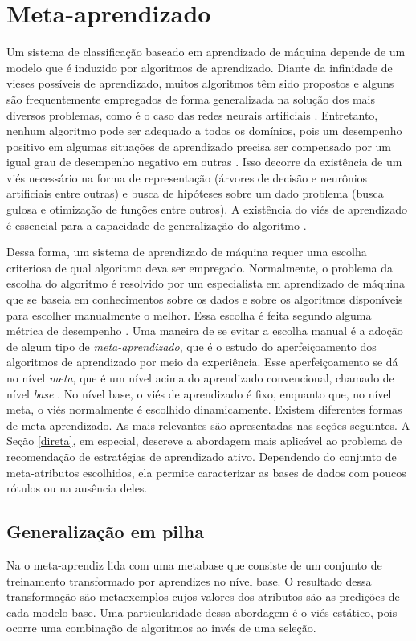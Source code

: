 \section{Meta-aprendizado}\label{ma}
Um sistema de classificação baseado em aprendizado de máquina depende
de um modelo que é induzido por algoritmos de aprendizado.
Diante da infinidade de vieses possíveis de aprendizado,
muitos algoritmos têm sido propostos e alguns são frequentemente
empregados de forma generalizada na solução dos mais diversos problemas,
como é o caso das redes neurais artificiais \citep{haykin2004comprehensive}.
Entretanto, nenhum algoritmo pode ser adequado a todos os domínios,
pois um desempenho positivo em algumas situações de aprendizado
precisa ser compensado por um igual grau de desempenho negativo
em outras \citep{conf/icml/Schaffer94}.
Isso decorre da existência de um viés necessário na forma de representação
(árvores de decisão e neurônios artificiais entre outras)
e busca de hipóteses sobre um dado problema (busca gulosa e otimização de funções entre outros).
A existência do viés de aprendizado é essencial para a capacidade de generalização
do algoritmo \citep{Mitchell:1980}.

Dessa forma, um sistema de aprendizado de máquina requer
uma escolha criteriosa de qual algoritmo deva ser empregado.
Normalmente, o problema da escolha do algoritmo é resolvido
por um especialista em aprendizado de máquina que se baseia em conhecimentos
sobre os dados e sobre os algoritmos disponíveis
para escolher manualmente o melhor.
Essa escolha é feita segundo alguma métrica de desempenho
\cite{books/daglib/0022052}.
Uma maneira de se evitar a escolha manual é a adoção de algum tipo
de \textit{meta-aprendizado}, que é o estudo do aperfeiçoamento dos
algoritmos de aprendizado por meio da experiência.
Esse aperfeiçoamento se dá no nível \textit{meta},
que é um nível acima do aprendizado convencional, chamado de nível \textit{base}
\citep{journals/air/VilaltaD02}.
No nível base, o viés de aprendizado é fixo, enquanto que,
no nível meta, o viés normalmente é escolhido dinamicamente.
Existem diferentes formas de meta-aprendizado.
As mais relevantes são apresentadas nas seções seguintes.
A Seção \ref{direta}, em especial, descreve a abordagem mais aplicável ao problema de
recomendação de estratégias de aprendizado ativo.
Dependendo do conjunto de meta-atributos escolhidos,
ela permite caracterizar as bases de dados com poucos rótulos ou na ausência deles.

\subsection{Generalização em pilha}
Na 
\citep{journals/nn/Wolpert92} o meta-aprendiz lida com uma metabase
que consiste de um conjunto de treinamento transformado por
aprendizes no nível base.
O resultado dessa transformação são metaexemplos cujos valores dos atributos
são as predições de cada modelo base.
Uma particularidade dessa abordagem é o viés estático,
pois ocorre uma combinação de algoritmos ao invés de uma seleção.

